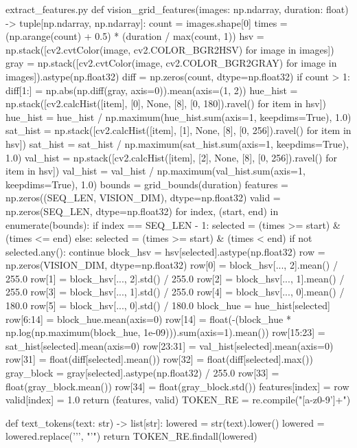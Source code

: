 \documentclass[bwprint]{gmcmthesis}
\begin{document}
\begin{appendices}
\begin{Python}{extract\_features.py}
def vision_grid_features(images: np.ndarray, duration: float) -> tuple[np.ndarray, np.ndarray]:
    count = images.shape[0]
    times = (np.arange(count) + 0.5) * (duration / max(count, 1))
    hsv = np.stack([cv2.cvtColor(image, cv2.COLOR_BGR2HSV) for image in images])
    gray = np.stack([cv2.cvtColor(image, cv2.COLOR_BGR2GRAY) for image in images]).astype(np.float32)
    diff = np.zeros(count, dtype=np.float32)
    if count > 1:
        diff[1:] = np.abs(np.diff(gray, axis=0)).mean(axis=(1, 2))
    hue_hist = np.stack([cv2.calcHist([item], [0], None, [8], [0, 180]).ravel() for item in hsv])
    hue_hist = hue_hist / np.maximum(hue_hist.sum(axis=1, keepdims=True), 1.0)
    sat_hist = np.stack([cv2.calcHist([item], [1], None, [8], [0, 256]).ravel() for item in hsv])
    sat_hist = sat_hist / np.maximum(sat_hist.sum(axis=1, keepdims=True), 1.0)
    val_hist = np.stack([cv2.calcHist([item], [2], None, [8], [0, 256]).ravel() for item in hsv])
    val_hist = val_hist / np.maximum(val_hist.sum(axis=1, keepdims=True), 1.0)
    bounds = grid_bounds(duration)
    features = np.zeros((SEQ_LEN, VISION_DIM), dtype=np.float32)
    valid = np.zeros(SEQ_LEN, dtype=np.float32)
    for index, (start, end) in enumerate(bounds):
        if index == SEQ_LEN - 1:
            selected = (times >= start) & (times <= end)
        else:
            selected = (times >= start) & (times < end)
        if not selected.any():
            continue
        block_hsv = hsv[selected].astype(np.float32)
        row = np.zeros(VISION_DIM, dtype=np.float32)
        row[0] = block_hsv[..., 2].mean() / 255.0
        row[1] = block_hsv[..., 2].std() / 255.0
        row[2] = block_hsv[..., 1].mean() / 255.0
        row[3] = block_hsv[..., 1].std() / 255.0
        row[4] = block_hsv[..., 0].mean() / 180.0
        row[5] = block_hsv[..., 0].std() / 180.0
        block_hue = hue_hist[selected]
        row[6:14] = block_hue.mean(axis=0)
        row[14] = float(-(block_hue * np.log(np.maximum(block_hue, 1e-09))).sum(axis=1).mean())
        row[15:23] = sat_hist[selected].mean(axis=0)
        row[23:31] = val_hist[selected].mean(axis=0)
        row[31] = float(diff[selected].mean())
        row[32] = float(diff[selected].max())
        gray_block = gray[selected].astype(np.float32) / 255.0
        row[33] = float(gray_block.mean())
        row[34] = float(gray_block.std())
        features[index] = row
        valid[index] = 1.0
    return (features, valid)
TOKEN_RE = re.compile("[a-z0-9']+")

def text_tokens(text: str) -> list[str]:
    lowered = str(text).lower()
    lowered = lowered.replace('’', "'")
    return TOKEN_RE.findall(lowered)


\end{Python}
\end{appendices}
\end{document}
